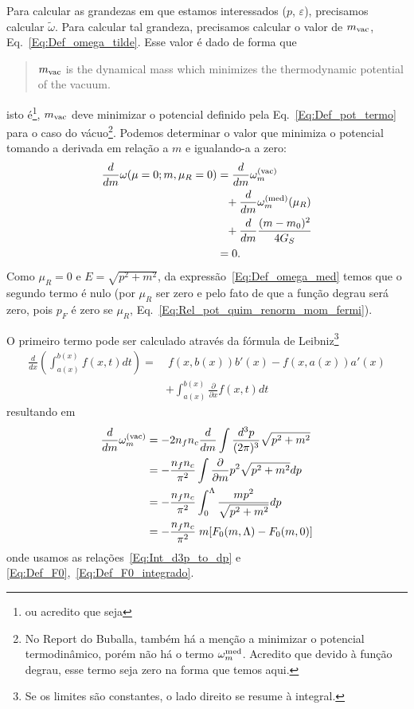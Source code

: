 Para calcular as grandezas em que estamos interessados ($p$, $\varepsilon$), precisamos calcular $\tilde{\omega}$. Para calcular tal grandeza, precisamos calcular o valor de $m_{\rm{vac}}$, Eq.~\eqref{Eq:Def_omega_tilde}. Esse valor é dado de forma que\cite{Buballa1996}
\begin{quote}
	$m_{\rm{vac}}$ is the dynamical mass which minimizes the thermodynamic potential of the vacuum.
\end{quote}
%
isto é\footnote{ou acredito que seja}, $m_{\rm{vac}}$ deve minimizar o potencial definido pela Eq.~\ref{Eq:Def_pot_termo} para o caso do vácuo\footnote{No Report do Buballa, também há a menção a minimizar o potencial termodinâmico, porém não há o termo $\omega_m^{\rm{med}}$. Acredito que devido à função degrau, esse termo seja zero na forma que temos aqui.}. Podemos determinar o valor que minimiza o potencial tomando a derivada em relação a $m$ e igualando-a a zero:
\begin{align}
	\frac{d}{dm} \omega(\mu = 0; m, \mu_R = 0) &= \frac{d}{dm}\omega_m^{\rm{(vac)}} \\
	&\phantom{=} + \frac{d}{dm}\omega_m^{\rm{(med)}}(\mu_R) \nonumber \\
	&\phantom{=} + \frac{d}{dm}\frac{(m - m_0)^2}{4G_S} \nonumber \\
	&= 0.\nonumber
\end{align}
%
Como $\mu_R = 0$ e $E = \sqrt{p^2+m^2}$, da expressão~\eqref{Eq:Def_omega_med} temos que o segundo termo é nulo (por $\mu_R$ ser zero e pelo fato de que a função degrau será zero, pois $p_F$ é zero se $\mu_R$, Eq.~\eqref{Eq:Rel_pot_quim_renorm_mom_fermi}).

O primeiro termo pode ser calculado através da fórmula de Leibniz\footnote{Se os limites são constantes, o lado direito se resume à integral.}
\begin{equation}
\begin{split}
	\frac{d}{dx} \left(\int_{a(x)}^{b(x)} f(x,t) dt\right) =&~ f(x, b(x))b'(x) - f(x, a(x))a'(x) \\
	&+ \int_{a(x)}^{b(x)}\frac{\partial}{\partial x}f(x,t) dt
\end{split}
\end{equation}
%
resultando em
\begin{align}
	\frac{d}{dm}\omega_m^{\rm{(vac)}} &= -2 n_f n_c\frac{d}{dm}\int \frac{d^3p}{(2\pi)^3} \sqrt{p^2 + m^2} \\
	&= - \frac{n_f n_c}{\pi^2} \int \frac{\partial}{\partial m} p^2\sqrt{p^2+m^2} dp \\
	&= - \frac{n_f n_c}{\pi^2} \int_0^\Lambda \frac{mp^2}{\sqrt{p^2+m^2}} dp \\
	&= - \frac{n_f n_c}{\pi^2} \;m [F_0(m, \Lambda) - F_0(m,0)]
\end{align}
%
onde usamos as relações~\eqref{Eq:Int_d3p_to_dp} e \eqref{Eq:Def_F0},~\eqref{Eq:Def_F0_integrado}.

